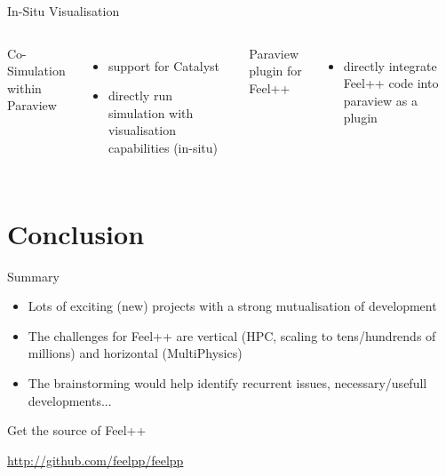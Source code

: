 \begin{frame}[fragile]{In-Situ Visualisation}
  \begin{columns}[c]
    Co-Simulation within Paraview
    \begin{itemize}
    \item support for Catalyst
    \item directly run simulation with visualisation capabilities (in-situ)
    \end{itemize}

    Paraview plugin for Feel++
    \begin{itemize}
    \item directly integrate Feel++ code into paraview as a plugin
    \end{itemize}
  \end{columns}

\end{frame}

\section{Conclusion}

\begin{frame}{Summary}

  \begin{itemize}
  \item Lots of exciting (new) projects with a strong mutualisation of
    development
  \item The challenges for Feel++ are vertical (HPC, scaling to
    tens/hundrends of millions) and horizontal
    (MultiPhysics)
  \item The brainstorming would help identify recurrent issues,
    necessary/usefull developments...
  \end{itemize}

  Get the source of Feel++

  \begin{center}\url{http://github.com/feelpp/feelpp}\end{center}

\end{frame}

